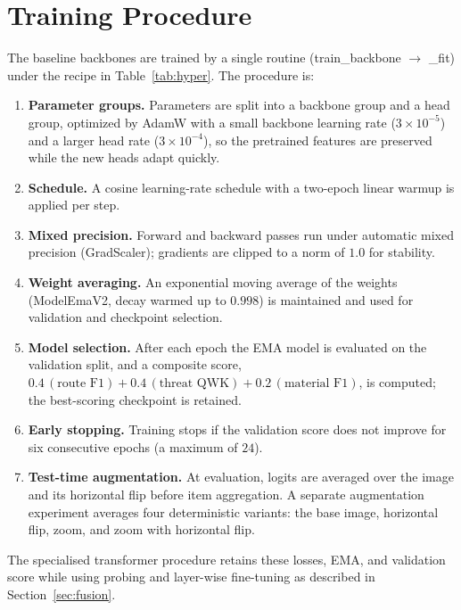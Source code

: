 \section{Training Procedure}
The baseline backbones are trained by a single routine (train\_backbone $\rightarrow$ \_fit) under the recipe in Table~\ref{tab:hyper}. The procedure is:
\begin{enumerate}
    \item \textbf{Parameter groups.} Parameters are split into a backbone group and a head group, optimized by AdamW with a small backbone learning rate ($3\times10^{-5}$) and a larger head rate ($3\times10^{-4}$), so the pretrained features are preserved while the new heads adapt quickly.
    \item \textbf{Schedule.} A cosine learning-rate schedule with a two-epoch linear warmup is applied per step.
    \item \textbf{Mixed precision.} Forward and backward passes run under automatic mixed precision (GradScaler); gradients are clipped to a norm of $1.0$ for stability.
    \item \textbf{Weight averaging.} An exponential moving average of the weights (ModelEmaV2, decay warmed up to $0.998$) is maintained and used for validation and checkpoint selection.
    \item \textbf{Model selection.} After each epoch the EMA model is evaluated on the validation split, and a composite score, $0.4\,(\text{route F1}) + 0.4\,(\text{threat QWK}) + 0.2\,(\text{material F1})$, is computed; the best-scoring checkpoint is retained.
    \item \textbf{Early stopping.} Training stops if the validation score does not improve for six consecutive epochs (a maximum of $24$).
    \item \textbf{Test-time augmentation.} At evaluation, logits are averaged over the image and its horizontal flip before item aggregation. A separate augmentation experiment averages four deterministic variants: the base image, horizontal flip, zoom, and zoom with horizontal flip.
\end{enumerate}
The specialised transformer procedure retains these losses, EMA, and validation score while using probing and layer-wise fine-tuning as described in Section~\ref{sec:fusion}.


